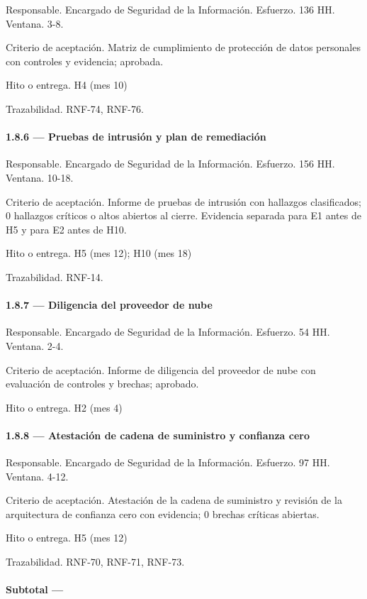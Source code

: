 \documentclass[11pt]{article}
\begin{document}
Responsable. Encargado de Seguridad de la Información. Esfuerzo. 136 HH. Ventana. 3-8.

Criterio de aceptación. Matriz de cumplimiento de protección de datos personales con controles y evidencia; aprobada.

Hito o entrega. H4 (mes 10)

Trazabilidad. RNF-74, RNF-76.

\paragraph{1.8.6 — Pruebas de intrusión y plan de remediación}

Responsable. Encargado de Seguridad de la Información. Esfuerzo. 156 HH. Ventana. 10-18.

Criterio de aceptación. Informe de pruebas de intrusión con hallazgos clasificados; 0 hallazgos críticos o altos abiertos al cierre. Evidencia separada para E1 antes de H5 y para E2 antes de H10.

Hito o entrega. H5 (mes 12); H10 (mes 18)

Trazabilidad. RNF-14.

\paragraph{1.8.7 — Diligencia del proveedor de nube}

Responsable. Encargado de Seguridad de la Información. Esfuerzo. 54 HH. Ventana. 2-4.

Criterio de aceptación. Informe de diligencia del proveedor de nube con evaluación de controles y brechas; aprobado.

Hito o entrega. H2 (mes 4)

\paragraph{1.8.8 — Atestación de cadena de suministro y confianza cero}

Responsable. Encargado de Seguridad de la Información. Esfuerzo. 97 HH. Ventana. 4-12.

Criterio de aceptación. Atestación de la cadena de suministro y revisión de la arquitectura de confianza cero con evidencia; 0 brechas críticas abiertas.

Hito o entrega. H5 (mes 12)

Trazabilidad. RNF-70, RNF-71, RNF-73.

\paragraph{Subtotal — }
\end{document}
